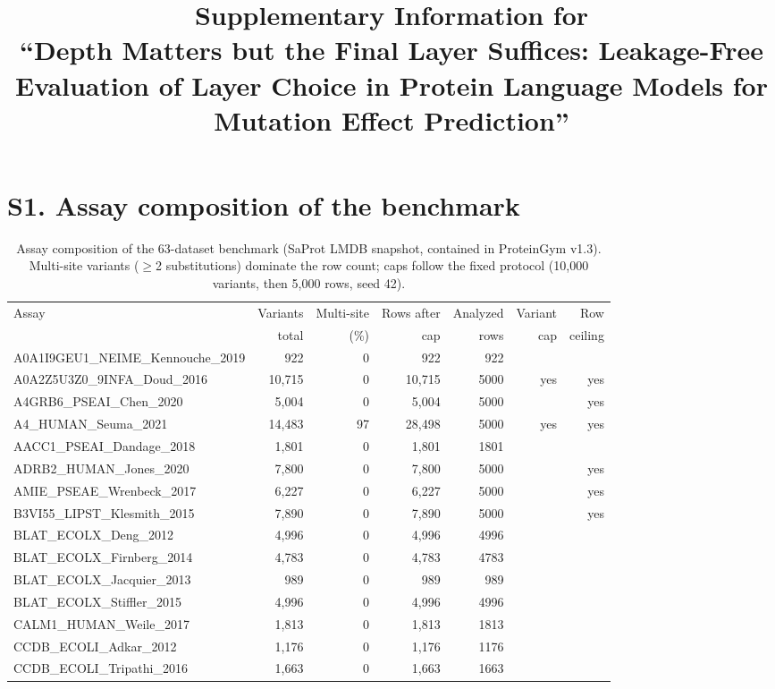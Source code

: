\documentclass[11pt,a4paper]{article}
\title{Supplementary Information for\\ ``Depth Matters but the Final Layer Suffices: Leakage-Free Evaluation of Layer Choice in Protein Language Models for Mutation Effect Prediction''}
\date{}
\begin{document}
\maketitle


\section*{S1. Assay composition of the benchmark}

\begin{table}[H]\centering\scriptsize
\caption{Assay composition of the 63-dataset benchmark (SaProt LMDB snapshot, contained in ProteinGym v1.3). Multi-site variants ($\geq$2 substitutions) dominate the row count; caps follow the fixed protocol (10{,}000 variants, then 5{,}000 rows, seed 42).}
\label{tab:S1assays}
\begin{tabular}{lrrrrrr}
\toprule
Assay & Variants & Multi-site & Rows after & Analyzed & Variant & Row \\
 & total & (\%) & cap & rows & cap & ceiling \\
\midrule
A0A1I9GEU1\_NEIME\_Kennouche\_2019 & 922 & 0 & 922 & 922 &  &  \\
A0A2Z5U3Z0\_9INFA\_Doud\_2016 & 10,715 & 0 & 10,715 & 5000 & yes & yes \\
A4GRB6\_PSEAI\_Chen\_2020 & 5,004 & 0 & 5,004 & 5000 &  & yes \\
A4\_HUMAN\_Seuma\_2021 & 14,483 & 97 & 28,498 & 5000 & yes & yes \\
AACC1\_PSEAI\_Dandage\_2018 & 1,801 & 0 & 1,801 & 1801 &  &  \\
ADRB2\_HUMAN\_Jones\_2020 & 7,800 & 0 & 7,800 & 5000 &  & yes \\
AMIE\_PSEAE\_Wrenbeck\_2017 & 6,227 & 0 & 6,227 & 5000 &  & yes \\
B3VI55\_LIPST\_Klesmith\_2015 & 7,890 & 0 & 7,890 & 5000 &  & yes \\
BLAT\_ECOLX\_Deng\_2012 & 4,996 & 0 & 4,996 & 4996 &  &  \\
BLAT\_ECOLX\_Firnberg\_2014 & 4,783 & 0 & 4,783 & 4783 &  &  \\
BLAT\_ECOLX\_Jacquier\_2013 & 989 & 0 & 989 & 989 &  &  \\
BLAT\_ECOLX\_Stiffler\_2015 & 4,996 & 0 & 4,996 & 4996 &  &  \\
CALM1\_HUMAN\_Weile\_2017 & 1,813 & 0 & 1,813 & 1813 &  &  \\
CCDB\_ECOLI\_Adkar\_2012 & 1,176 & 0 & 1,176 & 1176 &  &  \\
CCDB\_ECOLI\_Tripathi\_2016 & 1,663 & 0 & 1,663 & 1663 &  &  \\

\end{tabular}
\end{table}
\end{document}
